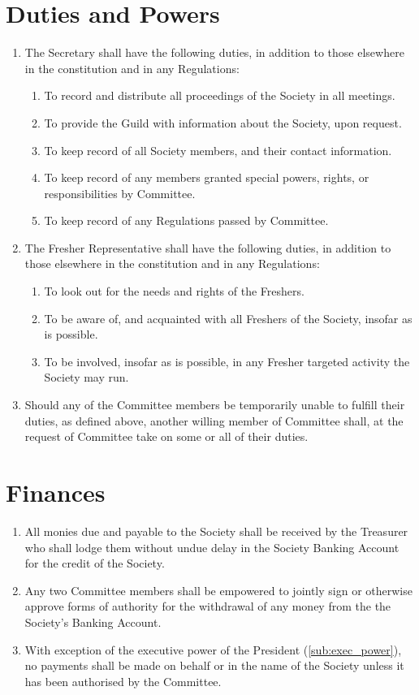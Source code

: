 \documentclass[a4paper]{article}
\newenvironment{enumsection}[1]{\section{#1} \begin{enumerate}[ref=\thesection.\theenumi]}{\end{enumerate}}
\begin{document}
\begin{enumsection}{Duties and Powers}
    \item The Secretary shall have the following duties, in addition to those elsewhere in the constitution and in any Regulations:
    \begin{enumerate}
        \item To record and distribute all proceedings of the Society in all meetings.
        \item To provide the Guild with information about the Society, upon request.
        \item To keep record of all Society members, and their contact information.
        \item To keep record of any members granted special powers, rights, or responsibilities by Committee.
        \item To keep record of any Regulations passed by Committee.
    \end{enumerate}
    
    \item The Fresher Representative shall have the following duties, in addition to those elsewhere in the constitution and in any Regulations:
    \begin{enumerate}
        \item To look out for the needs and rights of the Freshers.
        \item To be aware of, and acquainted with all Freshers of the Society, insofar as is possible.
        \item To be involved, insofar as is possible, in any Fresher targeted activity the Society may run.
    \end{enumerate}
    
    \item Should any of the Committee members be temporarily unable to fulfill their duties, as defined above, another willing member of Committee shall, at the request of Committee take on some or all of their duties.
\end{enumsection}


\begin{enumsection}{Finances} \label{sec:finances}
	\item All monies due and payable to the Society shall be received by the Treasurer who shall lodge them without undue delay in the Society Banking Account for the credit of the Society.
    \item Any two Committee members shall be empowered to jointly sign or otherwise approve forms of authority for the withdrawal of any money from the the Society's Banking Account.
    \item With exception of the executive power of the President (\cref{sub:exec_power}), no payments shall be made on behalf or in the name of the Society unless it has been authorised by the Committee.
\end{enumsection}
\end{document}
